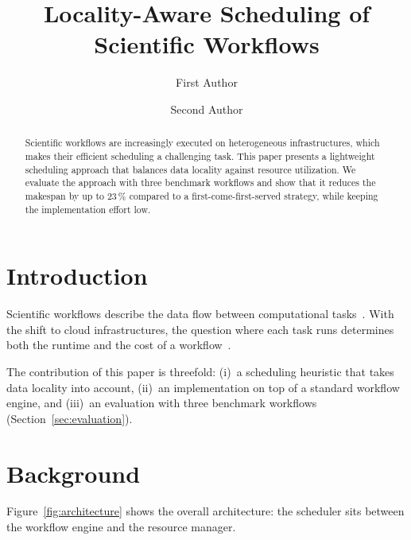 \title{Locality-Aware Scheduling of Scientific Workflows}
\author{First Author \and Second Author}
\maketitle

\begin{abstract}
Scientific workflows are increasingly executed on heterogeneous infrastructures, which makes their efficient scheduling a challenging task.
This paper presents a lightweight scheduling approach that balances data locality against resource utilization.
We evaluate the approach with three benchmark workflows and show that it reduces the makespan by up to 23\,\% compared to a first-come-first-served strategy, while keeping the implementation effort low.

\end{abstract}

\section{Introduction}\label{sec:introduction}
Scientific workflows describe the data flow between computational tasks~\cite{Winery}.
With the shift to cloud infrastructures, the question where each task runs determines both the runtime and the cost of a workflow~\cite{Binz2009}.
\lipsum[1]

The contribution of this paper is threefold: (i)~a scheduling heuristic that takes data locality into account, (ii)~an implementation on top of a standard workflow engine, and (iii)~an evaluation with three benchmark workflows (Section~\ref{sec:evaluation}).
\lipsum[2-3]

\section{Background}\label{sec:background}
\lipsum[4]
Figure~\ref{fig:architecture} shows the overall architecture: the scheduler sits between the workflow engine and the resource manager.


